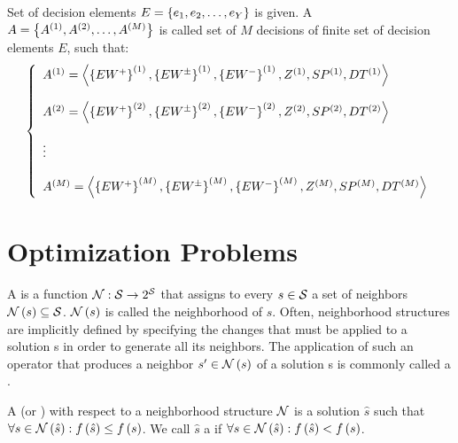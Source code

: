 \begin{defi}[Profile]
Set of decision elements $E=\left\{ e_1,e_2,\ldots,e_Y\right\}$ is given. A  $A=\left\{ A^{(1)},A^{(2)},\ldots,A^{(M)}\right\}$ is called set of $M$ decisions of finite set of decision elements $E$, such that:
\begin{equation}
\left\{\begin{array}{l}
A^{(1)}=\left\langle \left\{ EW^+\right\}^{(1)},\left\{ EW^{\pm}\right\}^{(1)},\left\{ EW^-\right\}^{(1)},Z^{(1)},SP^{(1)},DT^{(1)}\right\rangle\\\\
A^{(2)}=\left\langle \left\{ EW^+\right\}^{(2)},\left\{ EW^{\pm}\right\}^{(2)},\left\{ EW^-\right\}^{(2)},Z^{(2)},SP^{(2)},DT^{(2)}\right\rangle\\\\
\vdots\\\\
A^{(M)}=\left\langle \left\{ EW^+\right\}^{(M)},\left\{ EW^{\pm}\right\}^{(M)},\left\{ EW^-\right\}^{(M)},Z^{(M)},SP^{(M)},DT^{(M)}\right\rangle
\end{array}\right.
\end{equation}
\cite{conf/fedcsis/Sobieska-KarpinskaH12}
\end{defi}

\section{Optimization Problems}

\begin{defi}
A  is a function $\mathcal{N}:\mathcal{S}\rightarrow 2^{\mathcal{S}}$ that assigns to every $s\in\mathcal{S}$ a set of neighbors $\mathcal{N}\left(s\right)\subseteq\mathcal{S}$. $\mathcal{N}\left(s\right)$ is called the neighborhood of $s$. Often, neighborhood structures are implicitly defined by specifying the changes that must be applied to a solution s in order to generate all its neighbors. The application of such an operator that produces a neighbor $s'\in\mathcal{N}\left(s\right)$ of a solution s is commonly called a .\cite{alba05}
\end{defi}

\begin{defi}
A  (or ) with respect to a neighborhood structure $\mathcal{N}$ is a solution $\hat{s}$ such that $\forall s\in\mathcal{N}\left(\hat{s}\right):f\left(\hat{s}\right)\leq f\left(s\right)$. We call $\hat{s}$ a  if $\forall s\in\mathcal{N}\left(\hat{s}\right):f\left(\hat{s}\right)<f\left(s\right)$.\cite{alba05}
\end{defi}